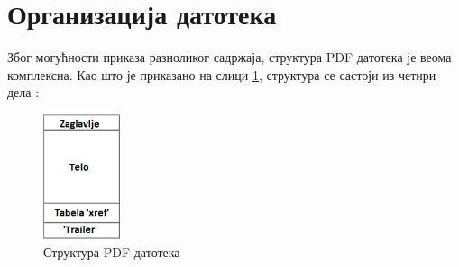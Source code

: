 \documentclass[12pt,oneside]{memoir}
\begin{document}
\section{Организација датотека}
\label{sec:organiyacijaDatotekaPDF}

Због могућности приказа разноликог садржаја, структура PDF датотека је веома комплексна. Као што је приказано на слици \ref{fig:pdfStruktura1}, структура се састоји из четири дела \cite{PDFDoc}:

\begin{figure}[!ht]
\centering
\includegraphics[width=0.2\textwidth]{pdfStruktura1.png}
\caption{Структура PDF датотека}
\label{fig:pdfStruktura1}
\end{figure}
\end{document}
